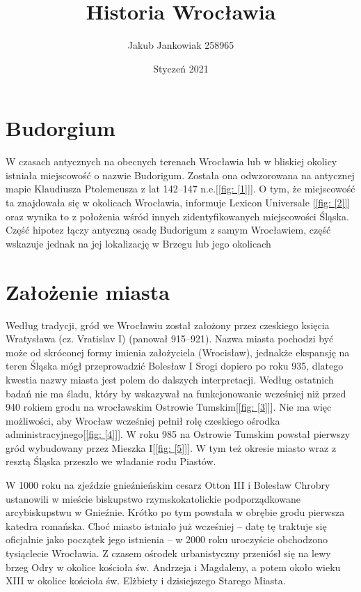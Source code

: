 \documentclass{article}
\title{Historia Wrocławia}
\author{Jakub Jankowiak 258965 }
\date{Styczeń 2021}
\begin{document}
\maketitle

\tableofcontents
\clearpage
\section{Budorgium}
W czasach antycznych na obecnych terenach Wrocławia lub w bliskiej okolicy istniała miejscowość o nazwie Budorigum. Została ona odwzorowana na antycznej mapie Klaudiusza Ptolemeusza z lat 142–147 n.e.[\ref{fig: [1]}]. O tym, że miejscowość ta znajdowała się w okolicach Wrocławia, informuje Lexicon Universale [\ref{fig: [2]}] oraz wynika to z położenia wśród innych zidentyfikowanych miejscowości Śląska. Część hipotez łączy antyczną osadę Budorigum z samym Wrocławiem, część wskazuje jednak na jej lokalizację w Brzegu lub jego okolicach


\section {Założenie miasta}
Według tradycji, gród we Wrocławiu został założony przez czeskiego księcia Wratysława (cz. Vratislav I) (panował 915–921). Nazwa miasta pochodzi być może od skróconej formy imienia założyciela (Wrocisław), jednakże ekspansję na teren Śląska mógł przeprowadzić Bolesław I Srogi dopiero po roku 935, dlatego kwestia nazwy miasta jest polem do dalszych interpretacji. Według ostatnich badań nie ma śladu, który by wskazywał na funkcjonowanie wcześniej niż przed 940 rokiem grodu na wrocławskim Ostrowie Tumskim[\ref{fig: [3]}]. Nie ma więc możliwości, aby Wrocław wcześniej pełnił rolę czeskiego ośrodka administracyjnego[\ref{fig: [4]}]. W roku 985 na Ostrowie Tumskim powstał pierwszy gród wybudowany przez Mieszka I[\ref{fig: [5]}]. W tym też okresie miasto wraz z resztą Śląska przeszło we władanie rodu Piastów.

W 1000 roku na zjeździe gnieźnieńskim cesarz Otton III i Bolesław Chrobry ustanowili w mieście biskupstwo rzymskokatolickie podporządkowane arcybiskupstwu w Gnieźnie. Krótko po tym powstała w obrębie grodu pierwsza katedra romańska. Choć miasto istniało już wcześniej – datę tę traktuje się oficjalnie jako początek jego istnienia – w 2000 roku uroczyście obchodzono tysiąclecie Wrocławia. Z czasem ośrodek urbanistyczny przeniósł się na lewy brzeg Odry w okolice kościoła św. Andrzeja i Magdaleny, a potem około wieku XIII w okolice kościoła św. Elżbiety i dzisiejszego Starego Miasta.
\end{document}
